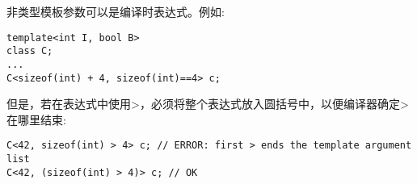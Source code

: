 非类型模板参数可以是编译时表达式。例如:

\begin{lstlisting}[style=styleCXX]
template<int I, bool B>
class C;
...
C<sizeof(int) + 4, sizeof(int)==4> c;
\end{lstlisting}

但是，若在表达式中使用>，必须将整个表达式放入圆括号中，以便编译器确定>在哪里结束:

\begin{lstlisting}[style=styleCXX]
C<42, sizeof(int) > 4> c; // ERROR: first > ends the template argument list
C<42, (sizeof(int) > 4)> c; // OK
\end{lstlisting}











